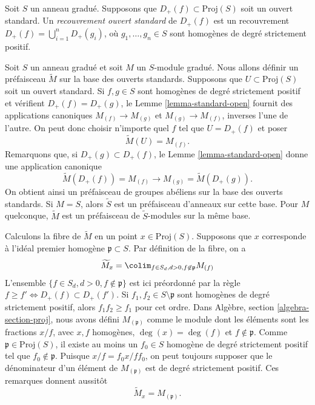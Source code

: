 \begin{definition}
\label{definition-standard-covering}
Soit $S$ un anneau gradué. Supposons que
$D_{+}(f) \subset \text{Proj}(S)$ soit un ouvert standard. Un
{\it recouvrement ouvert standard} de $D_{+}(f)$ est un recouvrement
$D_{+}(f) = \bigcup_{i = 1}^n D_{+}(g_i)$, où
$g_1, \ldots, g_n \in S$ sont homogènes de degré strictement positif.
\end{definition}

\noindent
Soit $S$ un anneau gradué et soit $M$ un $S$-module gradué. Nous allons
définir un préfaisceau $\widetilde M$ sur la base des ouverts standards.
Supposons que $U \subset \text{Proj}(S)$ soit un ouvert standard.
Si $f, g \in S$ sont homogènes de
degré strictement positif et vérifient
$D_{+}(f) = D_{+}(g)$, le Lemme \ref{lemma-standard-open} fournit des
applications canoniques $M_{(f)} \to M_{(g)}$ et
$M_{(g)} \to M_{(f)}$, inverses l'une de l'autre. On peut donc choisir
n'importe quel $f$ tel que $U = D_{+}(f)$ et poser
$$
\widetilde M(U) = M_{(f)}.
$$
Remarquons que, si $D_{+}(g) \subset D_{+}(f)$, le
Lemme \ref{lemma-standard-open} donne une application canonique
$$
\widetilde M(D_{+}(f)) = M_{(f)} \longrightarrow
M_{(g)} = \widetilde M(D_{+}(g)).
$$
On obtient ainsi un préfaisceau de
groupes abéliens sur la base des ouverts
standards. Si $M = S$, alors $\widetilde S$
est un préfaisceau d'anneaux sur
cette base. Pour $M$ quelconque, $\widetilde M$ est un préfaisceau de
$\widetilde S$-modules sur la même base.

\medskip\noindent
Calculons la fibre de $\widetilde M$ en un point
$x \in \text{Proj}(S)$. Supposons que $x$ corresponde à l'idéal premier
homogène $\mathfrak p \subset S$. Par définition de la fibre, on a
$$
\widetilde M_x
=
\colim_{f\in S_d, d > 0, f\not\in \mathfrak p} M_{(f)}
$$
L'ensemble $\{f \in S_d, d > 0, f \not \in \mathfrak p\}$ est ici préordonné
par la règle
$f \geq f' \Leftrightarrow D_{+}(f) \subset D_{+}(f')$.
Si $f_1, f_2 \in S \setminus \mathfrak p$ sont homogènes de degré strictement
positif, alors $f_1f_2 \geq f_1$ pour cet ordre. Dans Algèbre,
section \ref{algebra-section-proj}, nous avons défini
$M_{(\mathfrak p)}$ comme le module dont les éléments sont les fractions
$x/f$, avec $x, f$ homogènes,
$\deg(x) = \deg(f)$ et $f \not \in \mathfrak p$.
Comme $\mathfrak p \in \text{Proj}(S)$, il existe au
moins un $f_0 \in S$ homogène de degré strictement
positif tel que $f_0 \not\in \mathfrak p$. Puisque
$x/f = f_0x/ff_0$, on peut toujours supposer que le
dénominateur d'un élément de $M_{(\mathfrak p)}$ est de degré strictement
positif. Ces remarques donnent aussitôt
$$
\widetilde M_x = M_{(\mathfrak p)}.
$$


